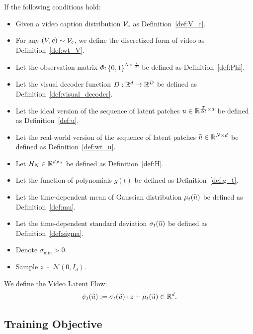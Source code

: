 \begin{definition}\label{def:psi}
    If the following conditions hold:
    \begin{itemize}
        \item Given a video caption distribution ${\cal V}_c$ as Definition~\ref{def:V_c}.
        \item For any $(V, c) \sim {\cal V}_c$, we define the discretized form of video as Definition~\ref{def:wt_V}.
        \item Let the observation matrix $\Phi: \{0, 1\}^{N \times \frac{T}{\Delta t}}$ be defined as Definition~\ref{def:Phi}.
        \item Let the visual decoder function $D: \mathbb{R}^d \rightarrow \mathbb{R}^D$ be defined as Definition~\ref{def:visual_decoder}.
        \item Let the ideal version of the sequence of latent patches $u \in \mathbb{R}^{\frac{T}{\Delta t} \times d}$ be defined as Definition~\ref{def:u}.
        \item Let the real-world version of the sequence of latent patches $\widetilde{u} \in \mathbb{R}^{N \times d}$ be defined as Definition~\ref{def:wt_u}.
        \item Let $H_N \in \mathbb{R}^{d \times s}$ be defined as Definition~\ref{def:H}.
        \item Let the function of polynomials $g(t)$ be defined as Definition~\ref{def:g_t}.
        \item Let the time-dependent mean of Gaussian distribution $\mu_t(\widetilde{u})$ be defined as Definition~\ref{def:mu}.
        \item Let the time-dependent standard deviation $\sigma_t(\widetilde{u})$ be defined as Definition~\ref{def:sigma}.
        \item Denote $\sigma_{\min} > 0$.
        \item Sample $z \sim \mathcal{N}(0, I_d)$.
    \end{itemize}
    We define the Video Latent Flow:
    \begin{align*}
        \psi_t(\widetilde{u}) := \sigma_t(\widetilde{u}) \cdot z + \mu_t(\widetilde{u}) \in \mathbb{R}^d.
    \end{align*}
\end{definition}

\subsection{Training Objective} \label{sub:app:train_obj}

